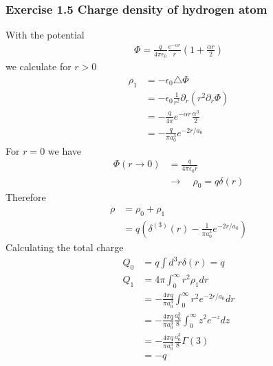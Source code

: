\documentclass[10pt,a4paper]{book}
\theoremstyle{definition}
\begin{document}
\subsubsection{Exercise 1.5 Charge density of hydrogen atom}
With the potential
\begin{align}
\Phi=\frac{q}{4\pi\epsilon_0}\frac{e^{-\alpha r}}{r}\left(1+\frac{\alpha r}{2}\right)
\end{align}
we calculate for $r>0$
\begin{align}
\rho_1
&=-\epsilon_0\triangle\Phi\\
&=-\epsilon_0\frac{1}{r^2}\partial_r(r^2\partial_r\Phi)\\
&=-\frac{q}{4\pi}e^{-\alpha r}\frac{\alpha^3}{2}\\
&=-\frac{q}{\pi a_0^3}e^{-2r/a_0}
\end{align}
For $r=0$ we have
\begin{align}
\Phi(r\rightarrow0)&=\frac{q}{4\pi\epsilon_0r}\\
&\rightarrow\quad \rho_0=q\delta(r)
\end{align}
Therefore
\begin{align}
\rho&=\rho_0+\rho_1\\
&=q\left(\delta^{(3)}(r)-\frac{1}{\pi a_0^3}e^{-2r/a_0}\right)
\end{align}
Calculating the total charge
\begin{align}
Q_0&=q\int d^3r\delta(r)=q\\
Q_1
&=4\pi\int_0^\infty r^2\rho_1 dr\\
&=-\frac{4\pi q}{\pi a_0^3}\int_0^\infty r^2e^{-2r/a_0}dr\\
&=-\frac{4\pi q}{\pi a_0^3}\frac{a_0^3}{8}\int_0^\infty z^2e^{-z}dz\\
&=-\frac{4\pi q}{\pi a_0^3}\frac{a_0^3}{8}\Gamma(3)\\
&=-q
\end{align}
\end{document}
